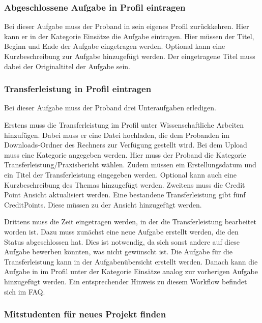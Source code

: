 \documentclass[
  12pt,
  ngerman,
  a4paper,
]{article}
\begin{document}
\hypertarget{abgeschlossene-aufgabe-in-profil-eintragen}{%
\subsubsection{Abgeschlossene Aufgabe in Profil
eintragen}\label{abgeschlossene-aufgabe-in-profil-eintragen}}

Bei dieser Aufgabe muss der Proband in sein eigenes Profil zurückkehren.
Hier kann er in der Kategorie Einsätze die Aufgabe eintragen. Hier
müssen der Titel, Beginn und Ende der Aufgabe eingetragen werden.
Optional kann eine Kurzbeschreibung zur Aufgabe hinzugefügt werden. Der
eingetragene Titel muss dabei der Originaltitel der Aufgabe sein.

\hypertarget{transferleistung-in-profil-eintragen}{%
\subsubsection{Transferleistung in Profil
eintragen}\label{transferleistung-in-profil-eintragen}}

Bei dieser Aufgabe muss der Proband drei Unteraufgaben erledigen.

Erstens muss die Transferleistung im Profil unter Wissenschaftliche
Arbeiten hinzufügen. Dabei muss er eine Datei hochladen, die dem
Probanden im Downloads-Ordner des Rechners zur Verfügung gestellt wird.
Bei dem Upload muss eine Kategorie angegeben werden. Hier muss der
Proband die Kategorie Transferleistung/Praxisbericht wählen. Zudem
müssen ein Erstellungsdatum und ein Titel der Transferleistung
eingegeben werden. Optional kann auch eine Kurzbeschreibung des Themas
hinzugefügt werden. Zweitens muss die Credit Point Ansicht aktualisiert
werden. Eine bestandene Transferleistung gibt fünf CreditPoints. Diese
müssen zu der Ansicht hinzugefügt werden.

Drittens muss die Zeit eingetragen werden, in der die Transferleistung
bearbeitet worden ist. Dazu muss zunächst eine neue Aufgabe erstellt
werden, die den Status abgeschlossen hat. Dies ist notwendig, da sich
sonst andere auf diese Aufgabe bewerben könnten, was nicht gewünscht
ist. Die Aufgabe für die Transferleistung kann in der Aufgabenübersicht
erstellt werden. Danach kann die Aufgabe in im Profil unter der
Kategorie Einsätze analog zur vorherigen Aufgabe hinzugefügt werden. Ein
entsprechender Hinweis zu diesem Workflow befindet sich im FAQ.

\hypertarget{mitstudenten-fuxfcr-neues-projekt-finden}{%
\subsubsection{Mitstudenten für neues Projekt
finden}\label{mitstudenten-fuxfcr-neues-projekt-finden}}
\end{document}
